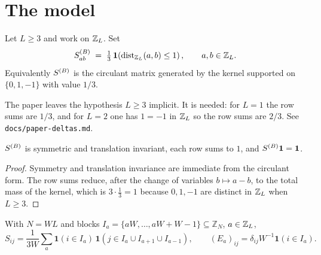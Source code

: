 \chapter{The model}

\begin{definition}\label{def:SB}
  \leanok
  Let $L\ge 3$ and work on $\mathbb{Z}_L$.  Set
  \[ S^{(B)}_{ab} \;=\; \tfrac13\,\mathbf 1\!\left(\operatorname{dist}_{\mathbb{Z}_L}(a,b)\le 1\right),
     \qquad a,b\in\mathbb{Z}_L . \]
  Equivalently $S^{(B)}$ is the circulant matrix generated by the kernel supported on
  $\{0,1,-1\}$ with value $1/3$.
\end{definition}

\begin{remark}\label{rem:L3}
  The paper leaves the hypothesis $L\ge 3$ implicit.  It is needed: for $L=1$ the
  row sums are $1/3$, and for $L=2$ one has $1=-1$ in $\mathbb{Z}_L$ so the row sums are
  $2/3$.  See \texttt{docs/paper-deltas.md}.
\end{remark}

\begin{lemma}\label{lem:SB-basic}
  \leanok{}
  $S^{(B)}$ is symmetric and translation invariant, each row sums to $1$, and
  $S^{(B)} \mathbf 1 = \mathbf 1$.
\end{lemma}
\begin{proof}\leanok{}
  Symmetry and translation invariance are immediate from the circulant form.  The
  row sums reduce, after the change of variables $b\mapsto a-b$, to the total mass
  of the kernel, which is $3\cdot\frac13=1$ because $0,1,-1$ are distinct in $\mathbb{Z}_L$
  when $L\ge 3$.
\end{proof}

\begin{definition}\label{def:model}
  \leanok{}
  With $N=WL$ and blocks $I_a=\{aW,\dots,aW+W-1\}\subseteq\mathbb Z_N$, $a\in\mathbb{Z}_L$,
  \[ S_{ij}=\frac1{3W}\sum_a \mathbf 1(i\in I_a)\,\mathbf 1(j\in I_a\cup I_{a+1}\cup I_{a-1}),
     \qquad (E_a)_{ij}=\delta_{ij}W^{-1}\mathbf 1(i\in I_a). \]
\end{definition}

